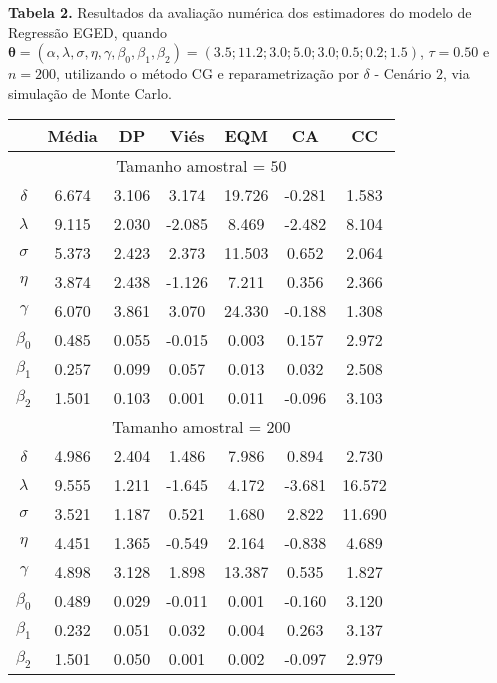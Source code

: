 \documentclass{sciposter}
\begin{document}
\begin{multicols}{3}
{%
\textbf{Tabela 2.} Resultados da avaliação numérica dos estimadores do modelo de Regressão EGED, quando $\bm{\theta} = (\alpha, \lambda,\sigma,\eta,\gamma,\beta_0,\beta_1,\beta_2)=(3.5; 11.2; 3.0; 5.0; 3.0; 0.5; 0.2; 1.5)$, $\tau =0.50$ e $n=200$, utilizando o método CG e reparametrização por $\delta$ - Cenário $2$, via simulação de Monte Carlo.

\begin{table}[H]

\centering
\begin{tabular}[t]{c|c|c|c|c|c|c}
\hline
& Média & DP & Viés & EQM & CA & CC\\
\hline
\multicolumn{7}{c}{Tamanho amostral = $50$} \\
\hline
$\delta$ & 6.674 & 3.106 & 3.174 & 19.726 & -0.281 & 1.583\\
$\lambda$ & 9.115 & 2.030 & -2.085 & 8.469 & -2.482 & 8.104\\
$\sigma$ & 5.373 & 2.423 & 2.373 & 11.503 & 0.652 & 2.064\\
$\eta$ & 3.874 & 2.438 & -1.126 & 7.211 & 0.356 & 2.366\\
$\gamma$ & 6.070 & 3.861 & 3.070 & 24.330 & -0.188 & 1.308\\
$\beta_0$ & 0.485 & 0.055 & -0.015 & 0.003 & 0.157 & 2.972\\
$\beta_1$ & 0.257 & 0.099 & 0.057 & 0.013 & 0.032 & 2.508\\
$\beta_2$ & 1.501 & 0.103 & 0.001 & 0.011 & -0.096 & 3.103\\
\hline
\multicolumn{7}{c}{Tamanho amostral = $200$} \\
\hline
$\delta$ & 4.986 & 2.404 & 1.486 & 7.986 & 0.894 & 2.730\\
$\lambda$ & 9.555 & 1.211 & -1.645 & 4.172 & -3.681 & 16.572\\
$\sigma$ & 3.521 & 1.187 & 0.521 & 1.680 & 2.822 & 11.690\\
$\eta$ & 4.451 & 1.365 & -0.549 & 2.164 & -0.838 & 4.689\\
$\gamma$ & 4.898 & 3.128 & 1.898 & 13.387 & 0.535 & 1.827\\
$\beta_0$ & 0.489 & 0.029 & -0.011 & 0.001 & -0.160 & 3.120\\
$\beta_1$ & 0.232 & 0.051 & 0.032 & 0.004 & 0.263 & 3.137\\
$\beta_2$ & 1.501 & 0.050 & 0.001 & 0.002 & -0.097 & 2.979\\

\end{tabular}
\end{table}}
\end{multicols}
\end{document}
